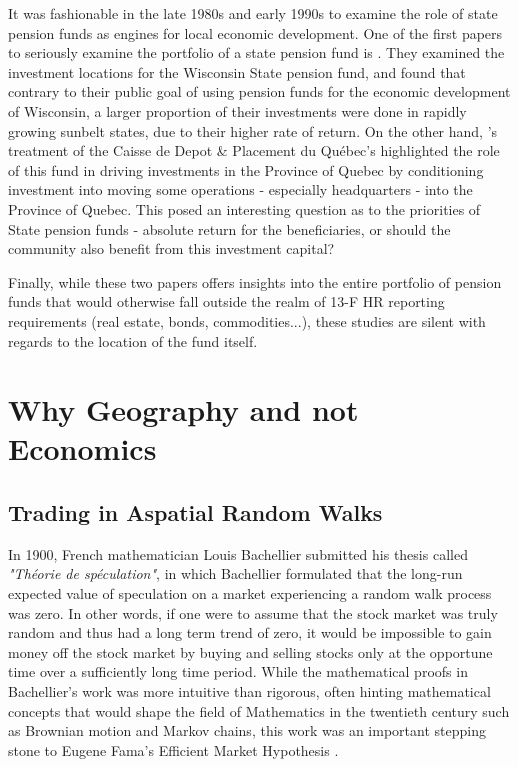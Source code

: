 It was fashionable in the late 1980s and early 1990s to examine the role of state pension funds as engines for local economic development.  One of the first papers to seriously examine the portfolio of a state pension fund is \cite{bottspension1987}.  They examined the investment locations for the Wisconsin State pension fund, and found that contrary to their public goal of using pension funds for the economic development of Wisconsin, a larger proportion of their investments were done in rapidly growing sunbelt states, due to their higher rate of return. On the other hand, \citeauthor{Caisse93}'s treatment of the Caisse de Depot \& Placement du Qu\'{e}bec's highlighted the role of this fund in driving investments in the Province of Quebec by conditioning investment into moving some operations - especially headquarters - into the Province of Quebec. This posed an interesting question as to the priorities of State pension funds - absolute return for the beneficiaries, or should the community also benefit from this investment capital? \citep{Caisse93}

Finally, while these two papers offers insights into the entire portfolio of pension funds that would otherwise fall outside the realm of 13-F HR reporting requirements (real estate, bonds, commodities...), these studies are silent with regards to the location of the fund itself.  


\section{Why Geography and not Economics}


\subsection{Trading in Aspatial Random Walks}
	
\nocite{Bachelier1900} 
In 1900, French mathematician Louis Bachellier submitted his thesis called \textit{"Th\'{e}orie de sp\'{e}culation"}, in which Bachellier formulated that the long-run expected value of speculation on a market experiencing a random walk process was zero. In other words, if one were to assume that the stock market was truly random and thus had a long term trend of zero, it would be impossible to gain money off the stock market by buying and selling stocks only at the opportune time over a sufficiently long time period. While the mathematical proofs in Bachellier's work was more intuitive than rigorous, often hinting mathematical concepts that would shape the field of Mathematics in the twentieth century such as Brownian motion and Markov chains, this work was an important stepping stone to Eugene Fama's Efficient Market Hypothesis \citep{Courtault2000}. 
	
